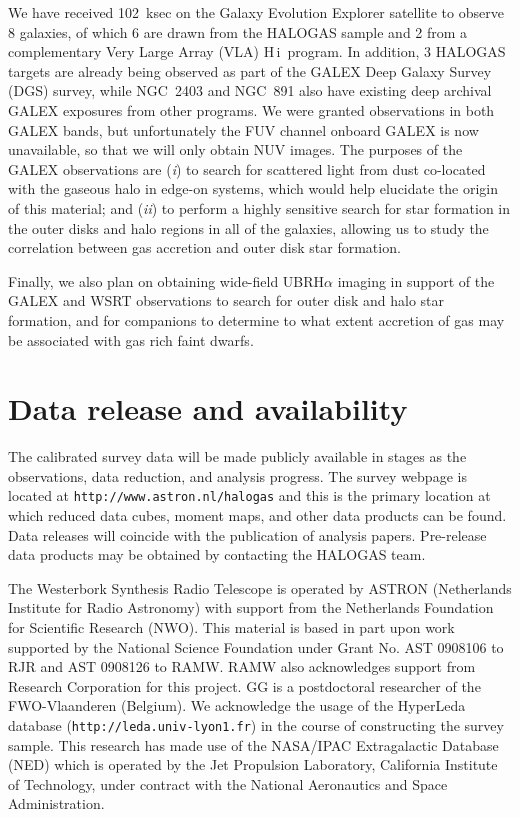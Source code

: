 \documentclass[oldversion]{aa}
\newcommand{\HI}{{\sc H\,i}}
\begin{document}
We have received 102~ksec on the Galaxy Evolution Explorer \citep[GALEX;][]{martin_etal_2005} satellite to observe 8 galaxies, of which 6 are drawn from the HALOGAS sample and 2 from a complementary Very Large Array (VLA) \HI\ program. In addition, 3 HALOGAS targets are already being observed as part of the GALEX Deep Galaxy Survey (DGS) survey, while NGC~2403 and NGC~891 also have existing deep archival GALEX exposures from other programs. We were granted observations in both GALEX bands, but unfortunately the FUV channel onboard GALEX is now unavailable, so that we will only obtain NUV images. The purposes of the GALEX observations are ({\it i}) to search for scattered light from dust co-located with the gaseous halo in edge-on systems, which would help elucidate the origin of this material; and ({\it ii}) to perform a highly sensitive search for star formation in the outer disks and halo regions in all of the galaxies, allowing us to study the correlation between gas accretion and outer disk star formation.

Finally, we also plan on obtaining wide-field UBRH$\alpha$ imaging in support of the GALEX and WSRT observations to search for outer disk and halo star formation, and for companions to determine to what extent accretion of gas may be associated with gas rich faint dwarfs.

\section{Data release and availability}\label{section:datarelease}

The calibrated survey data will be made publicly available in stages as the observations, data reduction, and analysis progress. The survey webpage is located at {\tt http://www.astron.nl/halogas} and this is the primary location at which reduced data cubes, moment maps, and other data products can be found. Data releases will coincide with the publication of analysis papers. Pre-release data products may be obtained by contacting the HALOGAS team.

\begin{acknowledgements}
The Westerbork Synthesis Radio Telescope is operated by ASTRON (Netherlands Institute for Radio Astronomy) with support from the Netherlands Foundation for Scientific Research (NWO). This material is based in part upon work supported by the National Science Foundation under Grant No. AST 0908106 to RJR and AST 0908126 to RAMW. RAMW also acknowledges support from Research Corporation for this project. GG is a postdoctoral researcher of the FWO-Vlaanderen (Belgium). We acknowledge the usage of the HyperLeda database ({\tt http://leda.univ-lyon1.fr}) in the course of constructing the survey sample. This research has made use of the NASA/IPAC Extragalactic Database (NED) which is operated by the Jet Propulsion Laboratory, California Institute of Technology, under contract with the National Aeronautics and Space Administration.
\end{acknowledgements}


\end{document}
